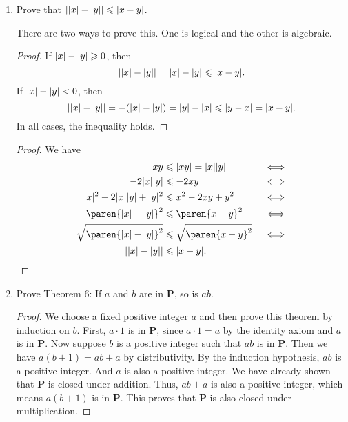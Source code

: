 \documentclass[a4paper]{article}
\begin{document}
\begin{enumerate}
\item Prove that \(\abs*{\abs x - \abs y} \le \abs{x - y}\).

  There are two ways to prove this.  One is logical and the other is
  algebraic.

  \begin{proof}
    If \(\abs x - \abs y \ge 0\), then
    \[
      \abs*{\abs x - \abs y} = \abs x - \abs y \le \abs{x - y}.
    \]
    If \(\lvert x\rvert - \lvert y\rvert < 0\), then
    \[
      \abs*{\abs x - \abs y} = - (\abs x - \abs y) = \abs y - \abs x \le \abs{y - x} = \abs{x - y}.
    \]
    In all cases, the inequality holds.
  \end{proof}

  \begin{proof}
    We have
    \begin{align*}
      xy &\le \abs{xy} = \abs x \abs y         && \iff \\
      -2\abs x\abs y
         &\le -2xy                             && \iff \\
      \abs x^2 - 2\abs x\abs y + \abs y^2
         &\le x^2 - 2xy + y^2                  && \iff \\
      \paren{\abs x - \abs y}^2
         &\le \paren{x - y}^2                  && \iff \\
      \sqrt{\paren{\abs x - \abs y}^2}
         &\le \sqrt{\paren{x - y}^2}           && \iff \\
      \abs*{\abs x - \abs y} &\le \abs{x - y}. && \qedhere
    \end{align*}
  \end{proof}

\item Prove Theorem 6: If \(a\) and \(b\) are in
  \(\mathbf{P}\), so is \(ab\).

  \begin{proof}
    We choose a fixed positive integer \(a\) and then prove this theorem
    by induction on \(b\).  First, \(a \cdot 1\) is in \(\mathbf{P}\),
    since \(a \cdot 1 = a\) by the identity axiom and \(a\) is in
    \(\mathbf{P}\).  Now suppose \(b\) is a positive integer such that
    \(ab\) is in \(\mathbf{P}\).  Then we have \(a(b+1) = ab + a \) by
    distributivity.  By the induction hypothesis, \(ab\) is a positive
    integer.  And \(a\) is also a positive integer.  We have already shown
    that \(\mathbf{P}\) is closed under addition.  Thus, \(ab + a\) is
    also a positive integer, which means \(a(b+1)\) is in \(\mathbf{P}\).
    This proves that \(\mathbf{P}\) is also closed under multiplication.
  \end{proof}


\end{enumerate}
\end{document}
